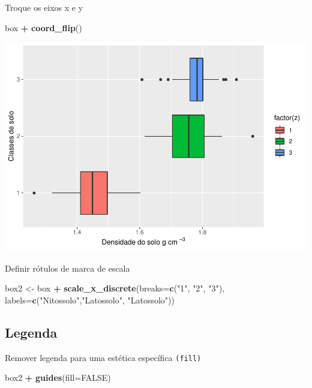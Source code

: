 \documentclass[]{book}
\newenvironment{Shaded}{\begin{snugshade}}{\end{snugshade}}
\newcommand{\DataTypeTok}[1]{\textcolor[rgb]{0.13,0.29,0.53}{#1}}
\newcommand{\KeywordTok}[1]{\textcolor[rgb]{0.13,0.29,0.53}{\textbf{#1}}}
\newcommand{\NormalTok}[1]{#1}
\newcommand{\OperatorTok}[1]{\textcolor[rgb]{0.81,0.36,0.00}{\textbf{#1}}}
\newcommand{\OtherTok}[1]{\textcolor[rgb]{0.56,0.35,0.01}{#1}}
\newcommand{\StringTok}[1]{\textcolor[rgb]{0.31,0.60,0.02}{#1}}
\begin{document}
Troque os eixos x e y

\begin{Shaded}
\begin{Highlighting}[]
\NormalTok{box }\OperatorTok{+}
\StringTok{  }\KeywordTok{coord_flip}\NormalTok{()}
\end{Highlighting}
\end{Shaded}

\includegraphics{TudodoR_files/figure-latex/unnamed-chunk-206-1.pdf}

Definir rótulos de marca de escala

\begin{Shaded}
\begin{Highlighting}[]
\NormalTok{box2 <-}\StringTok{ }\NormalTok{box }\OperatorTok{+}
\StringTok{          }\KeywordTok{scale_x_discrete}\NormalTok{(}\DataTypeTok{breaks=}\KeywordTok{c}\NormalTok{(}\StringTok{"1"}\NormalTok{, }\StringTok{"2"}\NormalTok{, }\StringTok{"3"}\NormalTok{),}
            \DataTypeTok{labels=}\KeywordTok{c}\NormalTok{(}\StringTok{"Nitossolo"}\NormalTok{,}\StringTok{"Latossolo"}\NormalTok{, }\StringTok{"Latossolo"}\NormalTok{))}
\end{Highlighting}
\end{Shaded}

\hypertarget{legenda}{%
\subsection{Legenda}\label{legenda}}

Remover legenda para uma estética específica \texttt{(fill)}

\begin{Shaded}
\begin{Highlighting}[]
\NormalTok{box2 }\OperatorTok{+}\StringTok{ }\KeywordTok{guides}\NormalTok{(}\DataTypeTok{fill=}\OtherTok{FALSE}\NormalTok{)}
\end{Highlighting}
\end{Shaded}
\end{document}
